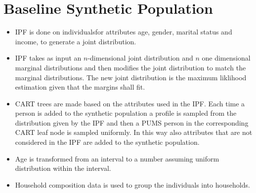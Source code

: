 \documentclass[12pt]{article}
\begin{document}
\section{Baseline Synthetic Population}
\begin{itemize}
\item
IPF is done on individualsfor attributes age, gender, marital status and
income, to generate a joint distribution.
\item
IPF takes as input an $n$-dimensional joint distribution and $n$ one dimensional
marginal distributions and then modifies the joint distribution to match the
marginal distributions. The new joint distribution is the maximum liklihood
estimation given that the margins shall fit. 
\item
CART trees are made based on the attributes used in the IPF. Each time a
person is added to the synthetic population a profile is sampled from the
distribution given by the IPF and then a PUMS person in the corresponding CART leaf
node is sampled uniformly. In this way also attributes that are not considered
in the IPF are added to the synthetic population.
\item
Age is transformed from an interval to a number assuming uniform distribution
within the interval.
\item
Household composition data is used to group the individuals into households.
\end{itemize}
\end{document}

